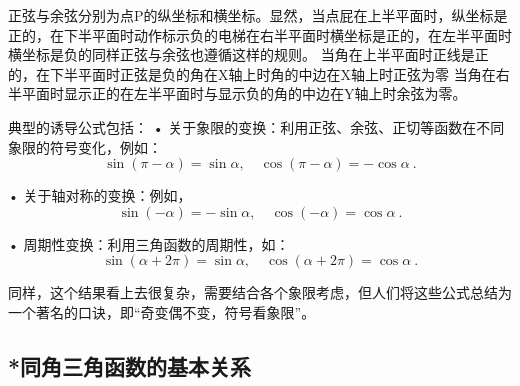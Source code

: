正弦与余弦分别为点P的纵坐标和横坐标。显然，当点屁在上半平面时，纵坐标是正的，在下半平面时动作标示负的电梯在右半平面时横坐标是正的，在左半平面时横坐标是负的同样正弦与余弦也遵循这样的规则。
当角在上半平面时正线是正的，在下半平面时正弦是负的角在X轴上时角的中边在X轴上时正弦为零
当角在右半平面时显示正的在左半平面时与显示负的角的中边在Y轴上时余弦为零。


典型的诱导公式包括：
	•	关于象限的变换：利用正弦、余弦、正切等函数在不同象限的符号变化，例如：
\begin{equation}
\sin(\pi - \alpha) = \sin \alpha, \quad \cos(\pi - \alpha) = -\cos \alpha~.
\end{equation}

	•	关于轴对称的变换：例如，
\begin{equation}
\sin(-\alpha) = -\sin \alpha, \quad \cos(-\alpha) = \cos \alpha~.
\end{equation}

	•	周期性变换：利用三角函数的周期性，如：
\begin{equation}
\sin(\alpha + 2\pi) = \sin \alpha, \quad \cos(\alpha + 2\pi) = \cos \alpha~.
\end{equation}


同样，这个结果看上去很复杂，需要结合各个象限考虑，但人们将这些公式总结为一个著名的口诀，即“奇变偶不变，符号看象限”。

\subsection{*同角三角函数的基本关系}

